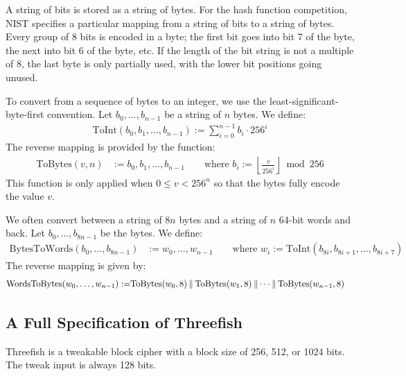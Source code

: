 \documentclass[11pt,twoside]{article}
\newcommand{\concat}{\mathbin{|\hspace{-1pt}|}}
\def\symdef#1{\label{symdef:#1}}
\newcommand{\ToInt}{\text{ToInt}\xspace}
\newcommand{\ToBytes}{\text{ToBytes}\xspace}
\newcommand{\BytesToWords}{\text{BytesToWords}\xspace}
\newcommand{\WordsToBytes}{\text{WordsToBytes}\xspace}
\begin{document}
A string of bits is stored as a string of bytes. For the hash function competition, NIST specifies a particular mapping from a string of bits to a string of bytes. Every group of 8 bits is encoded in a byte; the first bit goes into bit 7 of the byte, the next into bit 6 of the byte, etc. If the length of the bit string is not a multiple of 8, the last byte is only partially used, with the lower bit positions going unused.

To convert from a sequence of bytes to an integer, we use the least-significant-byte-first convention. Let $b_0, \ldots, b_{n-1}$ be a string of $n$ bytes. We define: \symdef{ToInt}
\begin{align*}
  \ToInt( b_0, b_1, \ldots, b_{n-1} ) := \sum_{i=0}^{n-1} b_i \cdot 256^i
\end{align*}
%
The reverse mapping is provided by the \ToBytes function: \symdef{ToBytes}
\begin{align*}
  \ToBytes( v, n )&:= b_0, b_1, \ldots, b_{n-1} \qquad
  \text{where } b_i := \left\lfloor \frac{v}{256^i} \right\rfloor \bmod 256
\end{align*}
This function is only applied when $0 \leq v < 256^n$ so that the bytes fully encode the value $v$.

We often convert between a string of $8n$ bytes and a string of $n$ 64-bit words and back. Let $b_0, \ldots, b_{8n-1}$ be the bytes. We define: \symdef{BytesToWords}
\begin{align*}
    \BytesToWords( b_0, \ldots, b_{8n-1} ) &:= w_0, \ldots, w_{n-1}
    \qquad \text{where }  w_i := \ToInt( b_{8i}, b_{8i+1}, \ldots, b_{8i+7} )
\end{align*}
The reverse mapping is given by: \symdef{WordsToBytes}
\begin{align*}
  \WordsToBytes( w_0, \ldots, w_{n-1} ) := &\ToBytes( w_0, 8 ) \concat
  \ToBytes( w_1, 8 ) \concat
  \cdots \concat
  \ToBytes( w_{n-1}, 8 )
\end{align*}

\subsection{A Full Specification of Threefish}

Threefish is a tweakable block cipher with a block size of 256, 512, or 1024 bits. The tweak input is always 128 bits.
\end{document}
